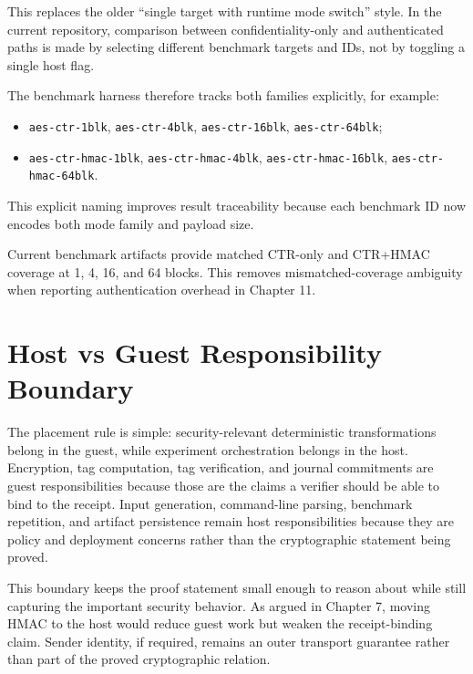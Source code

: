 This replaces the older ``single target with runtime mode switch'' style. In the
current repository, comparison between confidentiality-only and authenticated
paths is made by selecting different benchmark targets and IDs, not by toggling
a single host flag.

The benchmark harness therefore tracks both families explicitly, for example:

\begin{itemize}
\item \texttt{aes-ctr-1blk}, \texttt{aes-ctr-4blk}, \texttt{aes-ctr-16blk},
\texttt{aes-ctr-64blk};
\item \texttt{aes-ctr-hmac-1blk}, \texttt{aes-ctr-hmac-4blk},
\texttt{aes-ctr-hmac-16blk}, \texttt{aes-ctr-hmac-64blk}.
\end{itemize}

This explicit naming improves result traceability because each benchmark ID now
encodes both mode family and payload size.

Current benchmark artifacts provide matched CTR-only and CTR+HMAC coverage at 1,
4, 16, and 64 blocks. This removes mismatched-coverage ambiguity when reporting
authentication overhead in Chapter 11.

\section{Host vs Guest Responsibility Boundary}

The placement rule is simple: security-relevant deterministic transformations
belong in the guest, while experiment orchestration belongs in the host.
Encryption, tag computation, tag verification, and journal commitments are guest
responsibilities because those are the claims a verifier should be able to bind
to the receipt. Input generation, command-line parsing, benchmark repetition,
and artifact persistence remain host responsibilities because they are policy and
deployment concerns rather than the cryptographic statement being proved.

This boundary keeps the proof statement small enough to reason about while still
capturing the important security behavior. As argued in Chapter 7, moving HMAC to
the host would reduce guest work but weaken the receipt-binding claim. Sender
identity, if required, remains an outer transport guarantee rather than part of
the proved cryptographic relation.

